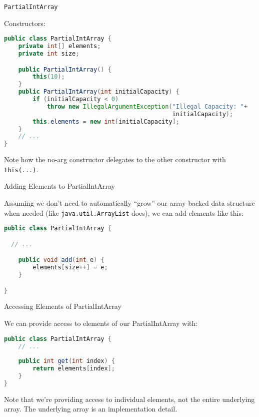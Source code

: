 \documentclass{beamer}
\begin{document}
\begin{frame}[fragile]{{\tt PartialIntArray}}


Constructors:
\begin{lstlisting}[language=Java]
public class PartialIntArray {
    private int[] elements;
    private int size;

    public PartialIntArray() {
        this(10);
    }
    public PartialIntArray(int initialCapacity) {
        if (initialCapacity < 0)
            throw new IllegalArgumentException("Illegal Capacity: "+
                                               initialCapacity);
        this.elements = new int[initialCapacity];
    }
    // ...
}
\end{lstlisting}
Note how the no-arg constructor delegates to the other constructor with {\tt this(...)}.
\end{frame}

\begin{frame}[fragile]{Adding Elements to PartialIntArray}


Assuming we don't need to automatically ``grow'' our array-backed data structure when needed (like {\tt java.util.ArrayList} does), we can add elements like this:

\begin{lstlisting}[language=Java]
public class PartialIntArray {

  // ...

    public void add(int e) {
        elements[size++] = e;
    }

}
\end{lstlisting}

\end{frame}

\begin{frame}[fragile]{Accessing Elements of PartialIntArray}


We can provide access to elements of our PartialIntArray with:

\begin{lstlisting}[language=Java]
public class PartialIntArray {
    // ...
    
    public int get(int index) {
        return elements[index];
    }
}
\end{lstlisting}

Note that we're providing access to individual elements, not the entire underlying array.  The underlying array is an implementation detail.
\end{frame}
\end{document}
